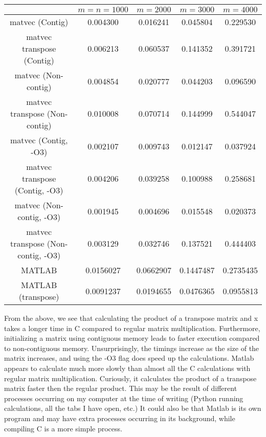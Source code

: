 \documentclass{article}
\begin{document}
\begin{center}
  \begin{tabular}{| c | c | c | c | c |}
    \hline
    $ $ & $m = n = 1000$ & $m = 2000$ & $m = 3000$ & $m = 4000$ \\
    \hline
    matvec (Contig) & 0.004300 & 0.016241 & 0.045804 & 0.229530 \\
    \hline
    matvec transpose (Contig) & 0.006213 & 0.060537 & 0.141352 & 0.391721 \\
    \hline
    matvec (Non-contig) & 0.004854 & 0.020777 & 0.044203 & 0.096590 \\ 
    \hline
    matvec transpose (Non-contig) & 0.010008 & 0.070714 & 0.144999 & 0.544047 \\
    \hline
    matvec (Contig, -O3) & 0.002107 & 0.009743 & 0.012147 & 0.037924 \\
    \hline
    matvec transpose (Contig, -O3) & 0.004206 & 0.039258 & 0.100988 & 0.258681 \\
    \hline
    matvec (Non-contig, -O3) & 0.001945 & 0.004696 & 0.015548 & 0.020373 \\ 
    \hline
    matvec transpose (Non-contig, -O3) & 0.003129 & 0.032746 & 0.137521 & 0.444403 \\
    \hline
    MATLAB & 0.0156027 & 0.0662907  & 0.1447487 & 0.2735435 \\
    \hline
    MATLAB (transpose) & 0.0091237 & 0.0194655 & 0.0476365 & 0.0955813 \\
    \hline
  \end{tabular}
\end{center}

From the above, we see that calculating the product of a transpose matrix and x takes a longer time in C compared to regular matrix multiplication. Furthermore, initializing a matrix using contiguous memory leads to faster execution compared to non-contiguous memory. Unsurprisingly, the timings increase as the size of the matrix increases, and using the -O3 flag does speed up the calculations. Matlab appears to calculate much more slowly than almost all the C calculations with regular matrix multiplication. Curiously, it calculates the product of a transpose matrix faster then the regular product. This may be the result of different processes occurring on my computer at the time of writing (Python running calculations, all the tabs I have open, etc.) It could also be that Matlab is its own program and may have extra processes occurring in its background, while compiling C is a more simple process.
\end{document}
